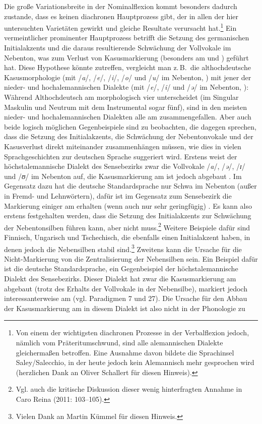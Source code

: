 Die große Variationsbreite in der Nominalflexion kommt besonders dadurch zustande, dass es keinen diachronen Hauptprozess gibt, der in allen der hier untersuchten Varietäten gewirkt und gleiche Resultate verursacht hat.\footnote{Von einem der wichtigsten diachronen Prozesse in der Verbalflexion jedoch, nämlich vom Präteritumschwund, sind alle alemannischen Dialekte gleichermaßen betroffen. Eine Ausnahme davon bildete die Sprachinsel Saley/Salecchio, in der heute jedoch kein Alemannisch mehr gesprochen wird (herzlichen Dank an Oliver Schallert für diesen Hinweis).} Ein vermeintlicher prominenter Hauptprozess betrifft die Setzung des germanischen Initialakzents und die daraus resultierende Schwächung der Vollvokale im Nebenton, was zum Verlust von Kasusmarkierung (besonders am  und ) geführt hat. Diese Hypothese könnte zutreffen, vergleicht man z.\,B.\ die althochdeutsche Kasusmorphologie (mit /\textit{a}/, /\textit{e}/, /\textit{i}/, /\textit{o}/ und /\textit{u}/ im Nebenton, \citealt[61]{Braune2004}) mit jener der nieder- und hochalemannischen Dialekte (mit /\textit{e}/, /\textit{i}/ und /\textit{ə}/ im Nebenton, \citealt[102--103]{Caro2011}): Während Althochdeutsch am  morphologisch vier  unterscheidet (im Singular Maskulin und Neutrum mit dem Instrumental sogar fünf), sind in den meisten nieder- und hochalemannischen Dialekten alle  am  zusammengefallen. Aber auch beide logisch möglichen Gegenbeispiele sind zu beobachten, die dagegen sprechen, dass die Setzung des Initialakzents, die Schwächung der Nebentonvokale und der Kasusverlust direkt miteinander zusammenhängen müssen, wie dies in vielen Sprachgeschichten zur deutschen Sprache suggeriert wird. Erstens weist der höchstalemannische Dialekt des Sensebezirks zwar die Vollvokale /\textit{a}/, /\textit{ə}/, /\textit{ɪ}/ und /\textit{ʊ}/ im Nebenton auf, die Kasusmarkierung am  ist jedoch abgebaut \citep[116, 179–190]{Henzen1927}. Im Gegensatz dazu hat die deutsche Standardsprache nur Schwa im Nebenton (außer in Fremd- und Lehnwörtern), dafür ist im Gegensatz zum Sensebezirk die Markierung einiger  am  erhalten (wenn auch nur sehr geringfügig) \citep[158--169]{Eisenberg2006}. Es kann also erstens festgehalten werden, dass die Setzung des Initialakzents zur Schwächung der Nebentonsilben führen kann, aber nicht muss.\footnote{Vgl. auch die kritische Diskussion dieser wenig hinterfragten Annahme in Caro Reina (2011: 103–105).} Weitere Beispiele dafür sind Finnisch, Ungarisch und Tschechisch, die ebenfalls einen Initialakzent haben, in denen jedoch die Nebensilben stabil sind.\footnote{Vielen Dank an Martin Kümmel für diesen Hinweis.} Zweitens kann die Ursache für die Nicht-Mar\-kie\-rung von  die Zentralisierung der Nebensilben sein. Ein Beispiel dafür ist die deutsche Standardsprache, ein Gegenbeispiel der höchstalemannische Dialekt des Sensebezirks. Dieser Dialekt hat zwar die Kasusmarkierung am  abgebaut (trotz des Erhalts der Vollvokale in der Nebensilbe), markiert jedoch interessanterweise  am  (vgl. Paradigmen 7 und 27). Die Ursache für den Abbau der Kasusmarkierung am  in diesem Dialekt ist also nicht in der Phonologie zu 